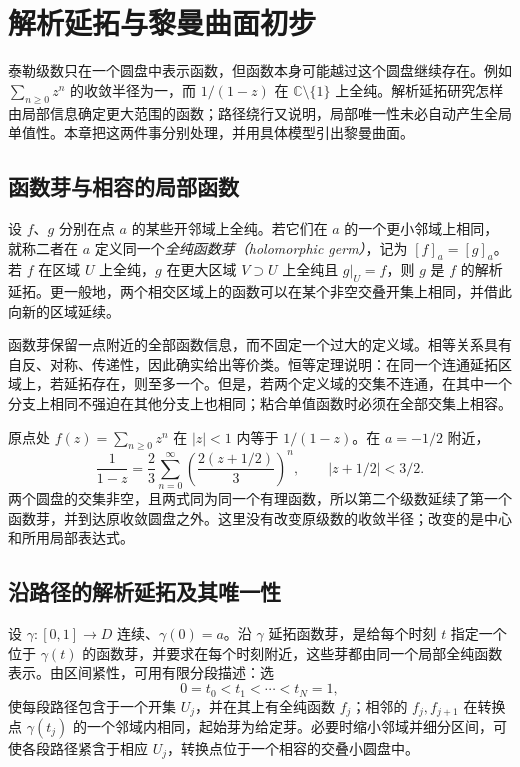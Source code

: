 \setcounter{chapter}{13} %
\chapter{解析延拓与黎曼曲面初步}
\label{chap:ca-continuation}

泰勒级数只在一个圆盘中表示函数，但函数本身可能越过这个圆盘继续存在。例如 $\sum_{n\ge0}z^n$ 的收敛半径为一，而 $1/(1-z)$ 在 $\mathbb C\setminus\{1\}$ 上全纯。解析延拓研究怎样由局部信息确定更大范围的函数；路径绕行又说明，局部唯一性未必自动产生全局单值性。本章把这两件事分别处理，并用具体模型引出黎曼曲面。

\section{函数芽与相容的局部函数}

\begin{definition}[函数芽与直接解析延拓]
设 $f$、$g$ 分别在点 $a$ 的某些开邻域上全纯。若它们在 $a$ 的一个更小邻域上相同，就称二者在 $a$ 定义同一个\emph{全纯函数芽（holomorphic germ）}，记为 $[f]_a=[g]_a$。若 $f$ 在区域 $U$ 上全纯，$g$ 在更大区域 $V\supset U$ 上全纯且 $g|_U=f$，则 $g$ 是 $f$ 的解析延拓。更一般地，两个相交区域上的函数可以在某个非空交叠开集上相同，并借此向新的区域延续。
\end{definition}

函数芽保留一点附近的全部函数信息，而不固定一个过大的定义域。相等关系具有自反、对称、传递性，因此确实给出等价类。恒等定理说明：在同一个连通延拓区域上，若延拓存在，则至多一个。但是，若两个定义域的交集不连通，在其中一个分支上相同不强迫在其他分支上也相同；粘合单值函数时必须在全部交集上相容。

\begin{example}[换中心扩展几何级数]
原点处 $f(z)=\sum_{n\ge0}z^n$ 在 $|z|<1$ 内等于 $1/(1-z)$。在 $a=-1/2$ 附近，
\[
 \frac1{1-z}=\frac{2}{3}\sum_{n=0}^{\infty}
 \left(\frac{2(z+1/2)}3\right)^n,
 \qquad |z+1/2|<3/2.
\]
两个圆盘的交集非空，且两式同为同一个有理函数，所以第二个级数延续了第一个函数芽，并到达原收敛圆盘之外。这里没有改变原级数的收敛半径；改变的是中心和所用局部表达式。
\end{example}

\section{沿路径的解析延拓及其唯一性}

设 $\gamma:[0,1]\to D$ 连续、$\gamma(0)=a$。沿 $\gamma$ 延拓函数芽，是给每个时刻 $t$ 指定一个位于 $\gamma(t)$ 的函数芽，并要求在每个时刻附近，这些芽都由同一个局部全纯函数表示。由区间紧性，可用有限分段描述：选
\[
 0=t_0<t_1<\cdots<t_N=1,
\]
使每段路径包含于一个开集 $U_j$，并在其上有全纯函数 $f_j$；相邻的 $f_j,f_{j+1}$ 在转换点 $\gamma(t_j)$ 的一个邻域内相同，起始芽为给定芽。必要时缩小邻域并细分区间，可使各段路径紧含于相应 $U_j$，转换点位于一个相容的交叠小圆盘中。


